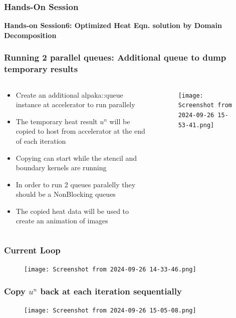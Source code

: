 \documentclass[9pt]{beamer}
\begin{document}
\begin{frame}
\frametitle{Hands-On Session}
\begin{center}
      \Huge \textbf{Hands-on Session6: Optimized Heat Eqn. solution by Domain Decomposition}
  \end{center}
\end{frame}


\begin{frame}
\frametitle{Running 2 parallel queues: Additional queue to dump temporary results}
\begin{columns}
  \begin{column}{0.63\textwidth}
\begin{itemize}
 \item Create an additional alpaka::queue instance at accelerator to run parallely
 \item The temporary heat result $u^{n}$ will be copied to host from accelerator at the end of each iteration
 \item Copying can start while the stencil and boundary kernels are running
 \item In order to run 2 queues paralelly they should be a NonBlocking queues
 \item The copied heat data will be used to create an animation of images
\end{itemize}
  \end{column}

  \begin{column}{0.37\textwidth}
\begin{figure}
    \centering
    \texttt{[image: Screenshot from 2024-09-26 15-53-41.png]}
\end{figure}
  \end{column}
  \end{columns}
\end{frame}

\begin{frame}
\frametitle{Current Loop}
\begin{figure}
    \centering
    \texttt{[image: Screenshot from 2024-09-26 14-33-46.png]}
\end{figure}
\end{frame}

\begin{frame}
\frametitle{Copy $u^{n}$ back at each iteration sequentially}
\begin{figure}
    \centering
    \texttt{[image: Screenshot from 2024-09-26 15-05-08.png]}
    \label{fig:enter-label}
\end{figure}
\end{frame}
\end{document}
